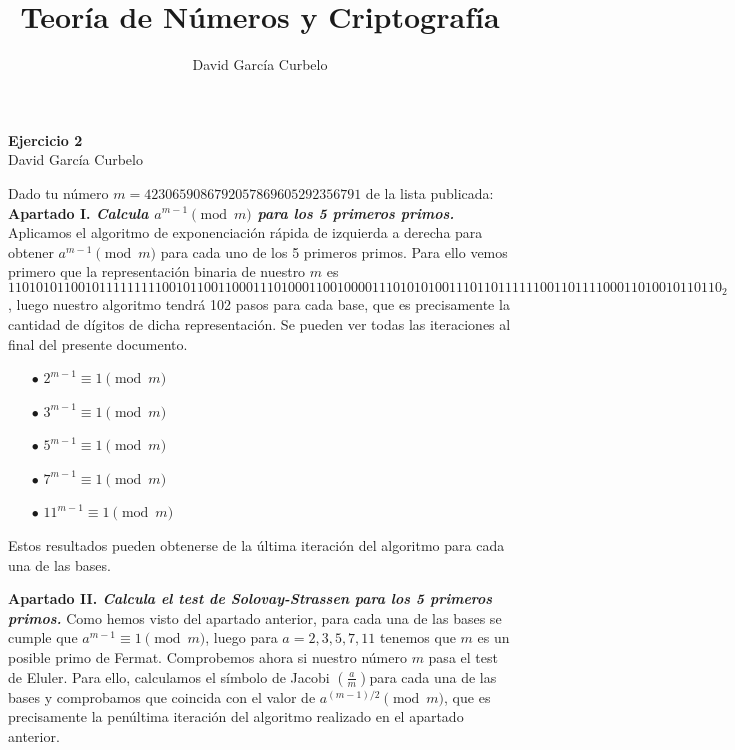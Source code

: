 \documentclass[fleqn]{article}
\author{David García Curbelo}
\title{Teoría de Números y Criptografía}
\begin{document}
    \begin{center}
        \LARGE{\textbf{Ejercicio 2}} \\
        \Large{David García Curbelo} \\
    \end{center}

    \vspace{1cm}
    
    Dado tu número $m = 4230659086792057869605292356791$  de la lista publicada: \\ 


    \textbf{Apartado I. \textit{Calcula $ a^{m-1} \pmod{m}$ para los 5 primeros primos.}} 
    Aplicamos el algoritmo de exponenciación rápida de izquierda a derecha para obtener $a^{m-1} \pmod{m}$ para cada 
    uno de los 5 primeros primos. Para ello vemos primero que la representación binaria de nuestro $m$ es 
    $110101011001011111111100101100110001110100011001000011101010100111011011111100110111100011010010110110_2$, luego 
    nuestro algoritmo tendrá 102 pasos para cada base, que es precisamente la cantidad de dígitos de dicha representación.
    Se pueden ver todas las iteraciones al final del presente documento.\\
    \begin{enumerate}
        \item[$\bullet$] $ 2^{m-1} \equiv 1 \pmod{m}$
        \item[$\bullet$] $ 3^{m-1} \equiv 1 \pmod{m}$
        \item[$\bullet$] $ 5^{m-1} \equiv 1 \pmod{m}$
        \item[$\bullet$] $ 7^{m-1} \equiv 1 \pmod{m}$
        \item[$\bullet$] $ 11^{m-1} \equiv 1 \pmod{m}$
    \end{enumerate}
    Estos resultados pueden obtenerse de la última iteración del algoritmo para cada una de las bases.


    \newpage
    \textbf{Apartado II. \textit{Calcula el test de Solovay-Strassen para los 5 primeros primos.}}
    Como hemos visto del apartado anterior, para cada una de las bases se cumple que $a^{m-1} \equiv 1 \pmod{m}$, luego para
    $a = 2,3,5,7,11$ tenemos que $m$ es un posible primo de Fermat. Comprobemos ahora si nuestro número $m$ pasa el test de
    Eluler. Para ello, calculamos el símbolo de Jacobi $\left(\frac{a}{m}\right)$para cada una de las bases y comprobamos que coincida con el valor de
    $a^{(m-1)/2} \pmod{m}$, que es precisamente la penúltima iteración del algoritmo realizado en el apartado anterior.\\
\end{document}
